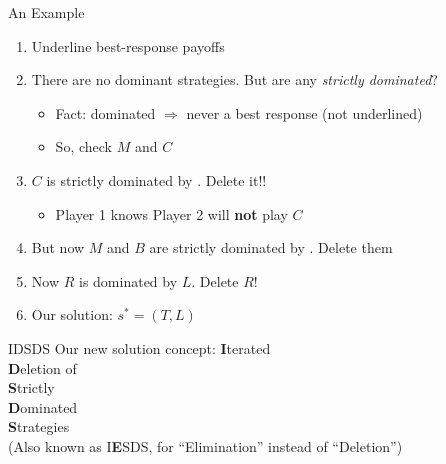 \begin{frame}{An Example}
\centering
\begin{matrixgame}[top={L, C, R}, left={T, M, B}, player names={Player 1, Player 2}, br=<2->]
\end{matrixgame}
\bsk
\raggedright
\begin{enumerate}
    \item Underline best-response payoffs
    \item<2-> There are no dominant strategies. But are any \textit{strictly dominated}?
    \begin{itemize}
        \item<2-> Fact: dominated $\Rightarrow$ never a best response (not underlined)
        \item<2-> So, check $M$ and $C$
    \end{itemize}
    \item<2-> $C$ is strictly dominated by \underline{\hspace{0.5in}}. Delete it!!
    \begin{itemize}
        \item Player 1 knows Player 2 will \textbf{not} play $C$
    \end{itemize}
    \item<3-> But now $M$ and $B$ are strictly dominated by \underline{\hspace{0.5in}}. Delete them
    \item<4-> Now $R$ is dominated by $L$. Delete $R$!
    \item<5-> Our solution: $s^*=(T,L)$
\end{enumerate}
\end{frame}

\begin{frame}{IDSDS}
    Our new solution concept:
    \vfill
    {\Large
    \textbf{I}terated\\
    \textbf{D}eletion of\\
    \textbf{S}trictly\\
    \textbf{D}ominated\\
    \textbf{S}trategies}\\
    \vfill
    (Also known as I\textbf{E}SDS, for ``Elimination'' instead of ``Deletion'')
\end{frame}

